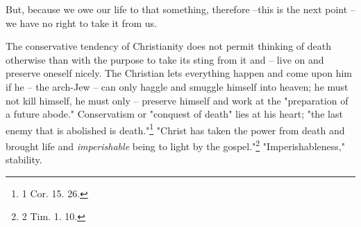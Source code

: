 \documentclass[a4paper]{book}
\begin{document}
But, because we owe our life to that something, therefore --this is the next 
point -- we have no right to take it from us.

The conservative tendency of Christianity does not permit thinking of death 
otherwise than with the purpose to take its sting from it and -- live on and 
preserve oneself nicely. The Christian lets everything happen and come upon 
him if he -- the arch-Jew -- can only haggle and smuggle himself into heaven; 
he must not kill himself, he must only -- preserve himself and work at the 
"{}preparation of a future abode."{} Conservatism or "{}conquest of death"{} 
lies at his heart; "{}the last enemy that is abolished is death."{}\footnote{1 
Cor. 15. 26.} "{}Christ has taken the power from death and brought life and 
\textit{imperishable} being to light by the gospel."{}\footnote{2 Tim. 1. 10.} 
"{}Imperishableness,"{} stability.
\end{document}
